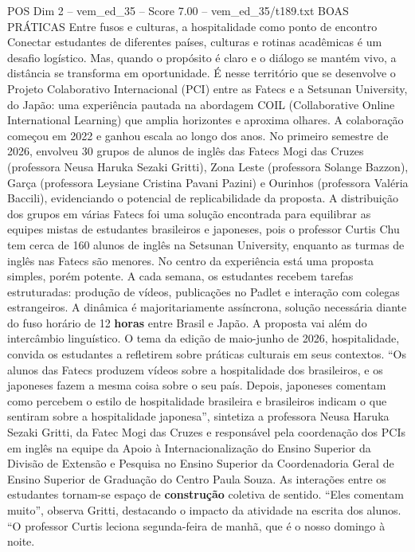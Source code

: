 \begin{textsample}{POS Dim 2 – vem\_ed\_35 – Score 7.00 – vem\_ed\_35/t189.txt}  \label{ex:f2_pos_001}
BOAS PRÁTICAS Entre fusos e culturas, a hospitalidade como ponto de encontro Conectar estudantes de diferentes países, culturas e rotinas acadêmicas é um desafio logístico.
Mas, quando o propósito é claro e o diálogo se mantém vivo, a distância se transforma em oportunidade.
É nesse território que se desenvolve o Projeto Colaborativo Internacional (PCI) entre as Fatecs e a Setsunan University, do Japão: uma experiência pautada na abordagem COIL (Collaborative Online International Learning) que amplia horizontes e aproxima olhares.
A colaboração começou em 2022 e ganhou escala ao longo dos anos.
No primeiro semestre de 2026, envolveu 30 grupos de alunos de inglês das Fatecs Mogi das Cruzes (professora Neusa Haruka Sezaki Gritti), Zona Leste (professora Solange Bazzon), Garça (professora Leysiane Cristina Pavani Pazini) e Ourinhos (professora Valéria Baccili), evidenciando o potencial de replicabilidade da proposta.
A distribuição dos grupos em várias Fatecs foi uma solução encontrada para equilibrar as equipes mistas de estudantes brasileiros e japoneses, pois o professor Curtis Chu tem cerca de 160 alunos de inglês na Setsunan University, enquanto as turmas de inglês nas Fatecs são menores.
No centro da experiência está uma proposta simples, porém potente.
A cada semana, os estudantes recebem tarefas estruturadas: produção de vídeos, publicações no Padlet e interação com colegas estrangeiros.
A dinâmica é majoritariamente assíncrona, solução necessária diante do fuso horário de 12 \textbf{horas} entre Brasil e Japão.
A proposta vai além do intercâmbio linguístico.
O tema da edição de maio-junho de 2026, hospitalidade, convida os estudantes a refletirem sobre práticas culturais em seus contextos. “Os alunos das Fatecs produzem vídeos sobre a hospitalidade dos brasileiros, e os japoneses fazem a mesma coisa sobre o seu país.
Depois, japoneses comentam como percebem o estilo de hospitalidade brasileira e brasileiros indicam o que sentiram sobre a hospitalidade japonesa”, sintetiza a professora Neusa Haruka Sezaki Gritti, da Fatec Mogi das Cruzes e responsável pela coordenação dos PCIs em inglês na equipe da Apoio à Internacionalização do Ensino Superior da Divisão de Extensão e Pesquisa no Ensino Superior da Coordenadoria Geral de Ensino Superior de Graduação do Centro Paula Souza.
As interações entre os estudantes tornam-se espaço de \textbf{construção} coletiva de sentido. “Eles comentam muito”, observa Gritti, destacando o impacto da atividade na escrita dos alunos. “O professor Curtis leciona segunda-feira de manhã, que é o nosso domingo à noite.

\end{textsample}

